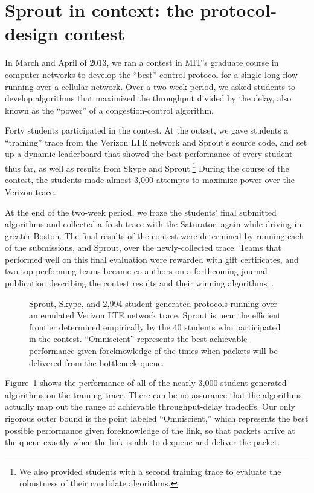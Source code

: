\section{Sprout in context: the protocol-design contest}
\label{s:cc-contest}

In March and April of 2013, we ran a contest in MIT's graduate course in computer
networks to develop the ``best'' control protocol for a single long flow
running over a cellular network. Over a two-week period, we asked
students to develop algorithms that maximized the throughput divided
by the delay, also known as the ``power'' of a congestion-control
algorithm.

Forty students participated in the contest. At the outset, we gave
students a ``training'' trace from the Verizon LTE network and
Sprout's source code, and set up a dynamic leaderboard that showed the
best performance of every student thus far, as well as results
from Skype and Sprout.\footnote{We also provided students with a
  second training trace to evaluate the robustness of their candidate
  algorithms.} During the course of the contest, the students made
almost 3,000 attempts to maximize power over the Verizon trace.

At the end of the two-week period, we froze the students' final
submitted algorithms and collected a fresh trace with the
Saturator, again while driving in greater Boston. The final results of the
contest were determined by running each of the submissions, and
Sprout, over the newly-collected trace. Teams that performed well on
this final evaluation were rewarded with gift certificates, and two
top-performing teams became co-authors on a forthcoming journal
publication describing the contest results and their
winning algorithms~\cite{cc-contest}.

\begin{figure}
\caption{Sprout, Skype, and 2,994 student-generated protocols running
  over an emulated Verizon LTE network trace. Sprout is near the
  efficient frontier determined empirically by the 40 students who
  participated in the contest. ``Omniscient'' represents the best
  achievable performance given foreknowledge of the times when packets
  will be delivered from the bottleneck queue.}
\vspace{\baselineskip}
\def\svgwidth{\columnwidth}
\label{fig:convex-hull}
\end{figure}

Figure~\ref{fig:convex-hull} shows the performance of all of the
nearly 3,000 student-generated algorithms on the training trace. There
can be no assurance that the algorithms actually map out the range of
achievable throughput-delay tradeoffs. Our only rigorous outer bound
is the point labeled ``Omniscient,'' which represents the best
possible performance given foreknowledge of the link, so that packets
arrive at the queue exactly when the link is able to dequeue and
deliver the packet.

